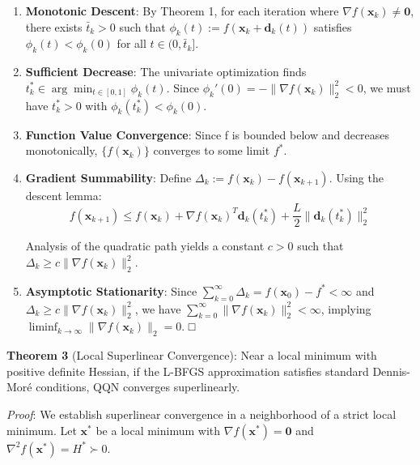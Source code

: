 \begin{enumerate}
\def\labelenumi{\arabic{enumi}.}
\item
  \textbf{Monotonic Descent}: By Theorem 1, for each iteration where \(\nabla f(\mathbf{x}_k) \neq \mathbf{0}\), there exists \(\bar{t}_k > 0\) such that \(\phi_k(t) := f(\mathbf{x}_k + \mathbf{d}_k(t))\) satisfies \(\phi_k(t) < \phi_k(0)\) for all \(t \in (0, \bar{t}_k]\).
\item
  \textbf{Sufficient Decrease}: The univariate optimization finds \(t_k^* \in \arg\min_{t \in [0,1]} \phi_k(t)\).
  Since \(\phi_k'(0) = -\|\nabla f(\mathbf{x}_k)\|_2^2 < 0\), we must have \(t_k^* > 0\) with \(\phi_k(t_k^*) < \phi_k(0)\).
\item
  \textbf{Function Value Convergence}: Since f is bounded below and decreases monotonically, \(\{f(\mathbf{x}_k)\}\) converges to some limit \(f^*\).
\item
  \textbf{Gradient Summability}: Define \(\Delta_k := f(\mathbf{x}_k) - f(\mathbf{x}_{k+1})\). Using the descent lemma:
  \[f(\mathbf{x}_{k+1}) \leq f(\mathbf{x}_k) + \nabla f(\mathbf{x}_k)^T \mathbf{d}_k(t_k^*) + \frac{L}{2}\|\mathbf{d}_k(t_k^*)\|_2^2\]

  Analysis of the quadratic path yields a constant \(c > 0\) such that \(\Delta_k \geq c\|\nabla f(\mathbf{x}_k)\|_2^2\).
\item
  \textbf{Asymptotic Stationarity}: Since \(\sum_{k=0}^{\infty} \Delta_k = f(\mathbf{x}_0) - f^* < \infty\) and
  \(\Delta_k \geq c\|\nabla f(\mathbf{x}_k)\|_2^2\), we have \(\sum_{k=0}^{\infty} \|\nabla f(\mathbf{x}_k)\|_2^2 < \infty\),
  implying \(\liminf_{k \to \infty} \|\nabla f(\mathbf{x}_k)\|_2 = 0\). □
\end{enumerate}

\textbf{Theorem 3} (Local Superlinear Convergence): Near a local minimum with positive definite Hessian, if the L-BFGS approximation satisfies standard Dennis-Moré conditions, QQN converges superlinearly.

\emph{Proof}: We establish superlinear convergence in a neighborhood of a strict local minimum. Let \(\mathbf{x}^*\) be a local minimum with \(\nabla f(\mathbf{x}^*) = \mathbf{0}\) and \(\nabla^2 f(\mathbf{x}^*) = H^* \succ 0\).

